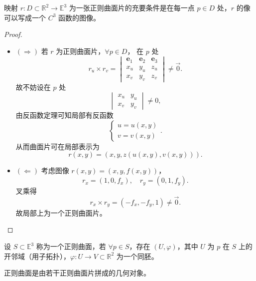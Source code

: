 \documentclass[lang=cn,10pt,thmcnt=section]{elegantbook}
\begin{document}
\begin{proposition}
    映射 $r: D \subset \mathbb{R}^2 \rightarrow \mathbb{E}^3$ 为一张正则曲面片的充要条件是在每一点 $p \in D$ 处，$r$ 的像可以写成一个 $C^3$ 函数的图像。
\end{proposition}
\begin{proof}
    \begin{itemize}
        \item $(\Rightarrow)$ 若 $r$ 为正则曲面片，$\forall p \in D$，
        在 $p$ 处
        $$
        r_u \times r_v = \begin{vmatrix}
        \mathbf{e}_1 & \mathbf{e}_2 & \mathbf{e}_3 \\
        x_u & y_u & z_u \\
        x_v & y_v & z_v
        \end{vmatrix} \neq \vec{0}.
        $$
        故不妨设在 $p$ 处
        $$
        \begin{vmatrix}
        x_u & y_u \\
        x_v & y_v
        \end{vmatrix} \neq 0,
        $$
        由反函数定理可知局部有反函数
        $$
        \begin{cases}
        u = u(x, y) \\
        v = v(x, y)
        \end{cases}.
        $$
        从而曲面片可在局部表示为
        $$
        r(x, y) = (x, y, z(u(x, y), v(x, y))).
        $$
    
        \item $(\Leftarrow)$ 考虑图像 $r(x, y) = (x, y, f(x, y))$，
        $$
        r_x = (1, 0, f_x), \quad r_y = (0, 1, f_y).
        $$
        叉乘得
        $$
        r_x \times r_y = (-f_x, -f_y, 1) \neq \vec{0}.
        $$
        故局部上为一个正则曲面片。  
      \end{itemize}  
\end{proof}   

\begin{definition}[正则曲面]
    设 $S \subset \mathbb{E}^3$ 称为一个正则曲面，若 $\forall p \in S$，存在 $(U, \varphi)$，其中 $U$ 为 $p$ 在 $S$ 上的开邻域（用子拓扑），$\varphi: U \rightarrow V \subset \mathbb{R}^2$ 为一个同胚。
    
    正则曲面是由若干正则曲面片拼成的几何对象。
\end{definition}
\end{document}
